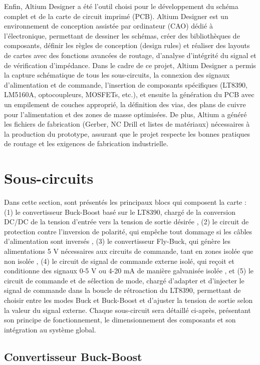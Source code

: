 Enfin, Altium Designer a été l'outil choisi pour le développement du schéma complet et de la carte de circuit imprimé (PCB). Altium Designer est un environnement de conception assistée par ordinateur (CAO) dédié à l'électronique, permettant de dessiner les schémas, créer des bibliothèques de composants, définir les règles de conception (design rules) et réaliser des layouts de cartes avec des fonctions avancées de routage, d'analyse d'intégrité du signal et de vérification d'impédance. Dans le cadre de ce projet, Altium Designer a permis la capture schématique de tous les sous-circuits, la connexion des signaux d'alimentation et de commande, l'insertion de composants spécifiques (LT8390, LM5160A, optocoupleurs, MOSFETs, etc.), et ensuite la génération du PCB avec un empilement de couches approprié, la définition des vias, des plans de cuivre pour l'alimentation et des zones de masse optimisées. De plus, Altium a généré les fichiers de fabrication (Gerber, NC Drill et listes de matériaux) nécessaires à la production du prototype, assurant que le projet respecte les bonnes pratiques de routage et les exigences de fabrication industrielle.




\section{Sous-circuits}

Dans cette section, sont présentés les principaux blocs qui composent la carte : (1) le convertisseur Buck-Boost basé sur le LT8390, chargé de la conversion DC/DC de la tension d'entrée vers la tension de sortie désirée , (2) le circuit de protection contre l'inversion de polarité, qui empêche tout dommage si les câbles d'alimentation sont inversés , (3) le convertisseur Fly-Buck, qui génère les alimentations 5 V nécessaires aux circuits de commande, tant en zones isolée que non isolée , (4) le circuit de signal de commande externe isolé, qui reçoit et conditionne des signaux 0-5 V ou 4-20 mA de manière galvanisée isolée , et (5) le circuit de commande et de sélection de mode, chargé d'adapter et d'injecter le signal de commande dans la boucle de rétroaction du LT8390, permettant de choisir entre les modes Buck et Buck-Boost et d'ajuster la tension de sortie selon la valeur du signal externe. Chaque sous-circuit sera détaillé ci-après, présentant son principe de fonctionnement, le dimensionnement des composants et son intégration au système global.

\subsection{Convertisseur Buck-Boost}

